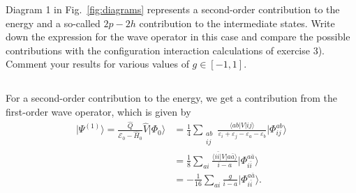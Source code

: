 Diagram 1 in Fig.~\ref{fig:diagrams} represents a second-order contribution to the energy and a so-called $2p-2h$ contribution to the intermediate states.
Write down the expression for the wave operator in this case and compare the possible contributions with the configuration interaction calculations of exercise 3). %
Comment your results for various values of $g \in [-1,1]$.

\subsection{}
For a second-order contribution to the energy, we get a contribution from the first-order wave operator, which is given by
\begin{align*}
    \vert \Psi^{(1)} \rangle
    = \frac{\hat{Q}}{\mathcal{E}_0 - \hat{H}_0} \hat{V} \vert \Phi_0 \rangle
    &= \frac{1}{4} \sum_{\substack{ab \\ ij}} \frac{\langle ab \vert V \vert ij \rangle}{\varepsilon_i + \varepsilon_j - \varepsilon_a - \varepsilon_b} \vert \Phi_{ij}^{ab} \rangle \\
    &= \frac{1}{8} \sum_{ai} \frac{\langle i\bar{i} \vert V \vert a\bar{a} \rangle}{i - a} \vert \Phi_{i\bar{i}}^{a\bar{a}} \rangle \\ %
    &= -\frac{1}{16} \sum_{ai} \frac{g}{i - a} \vert \Phi_{i\bar{i}}^{a\bar{a}} \rangle. %
\end{align*}

